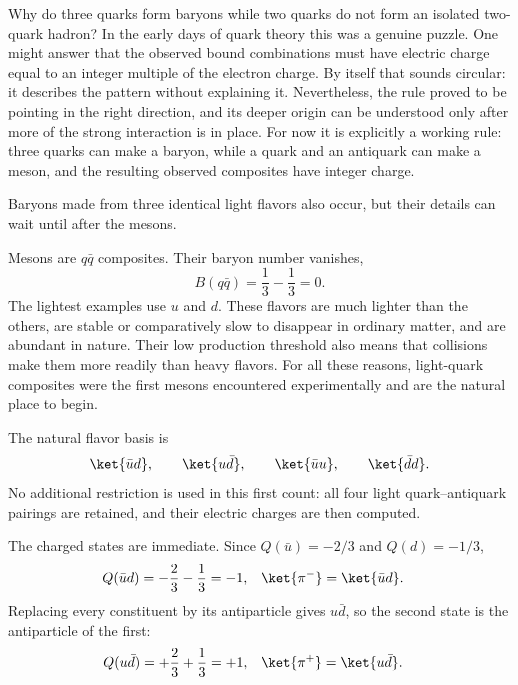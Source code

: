 \begin{classroomqa}
\end{classroomqa}

Why do three quarks form baryons while two quarks do not form an isolated two-quark hadron? In the early days of quark theory this was a genuine puzzle. One might answer that the observed bound combinations must have electric charge equal to an integer multiple of the electron charge. By itself that sounds circular: it describes the pattern without explaining it. Nevertheless, the rule proved to be pointing in the right direction, and its deeper origin can be understood only after more of the strong interaction is in place. For now it is explicitly a working rule: three quarks can make a baryon, while a quark and an antiquark can make a meson, and the resulting observed composites have integer charge.

Baryons made from three identical light flavors also occur, but their details can wait until after the mesons.

Mesons are \(q\bar q\) composites. Their baryon number vanishes,
\begin{equation}
B(q\bar q)=\frac13-\frac13=0.
\end{equation}
The lightest examples use \(u\) and \(d\). These flavors are much lighter than the others, are stable or comparatively slow to disappear in ordinary matter, and are abundant in nature. Their low production threshold also means that collisions make them more readily than heavy flavors. For all these reasons, light-quark composites were the first mesons encountered experimentally and are the natural place to begin.

The natural flavor basis is
\begin{equation}
\ket{\bar u d},\qquad \ket{u\bar d},\qquad \ket{\bar u u},\qquad \ket{\bar d d}.
\end{equation}
No additional restriction is used in this first count: all four light quark--antiquark pairings are retained, and their electric charges are then computed.

The charged states are immediate. Since \(Q(\bar u)=-2/3\) and \(Q(d)=-1/3\),
\begin{align}
Q(\bar u d)&=-\frac23-\frac13=-1,
&
\ket{\pi^-}&=\ket{\bar u d}.
\end{align}
Replacing every constituent by its antiparticle gives \(u\bar d\), so the second state is the antiparticle of the first:
\begin{align}
Q(u\bar d)&=+\frac23+\frac13=+1,
&
\ket{\pi^+}&=\ket{u\bar d}.
\end{align}

